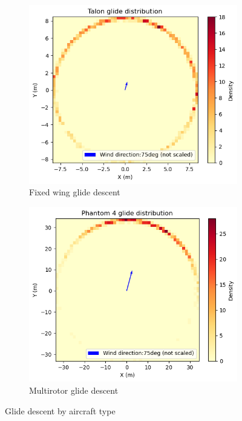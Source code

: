 \documentclass[12pt]{report}
\begin{document}
        \begin{figure}[H]
            \centering
            \begin{subfigure}[b]{0.45\textwidth}
                \centering
                \includegraphics[width=\textwidth]{Plot/talon/glide.png}
                \caption{Fixed wing glide descent}
                \label{fig:fixed_wing}
            \end{subfigure}
            \hfill
            \begin{subfigure}[b]{0.45\textwidth}
                \centering
                \includegraphics[width=\textwidth]{Plot/phantom4/glide.png}
                \caption{Multirotor glide descent}
                \label{fig:multirotor}
            \end{subfigure}
            \caption{Glide descent by aircraft type}
            \label{fig:ballistic_descent}
        \end{figure}
\end{document}
